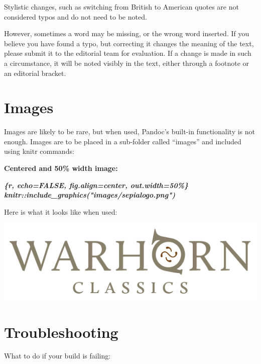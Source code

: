 \documentclass[
]{book}
\newenvironment{Shaded}{\begin{snugshade}}{\end{snugshade}}
\newcommand{\InformationTok}[1]{\textcolor[rgb]{0.56,0.35,0.01}{\textbf{\textit{#1}}}}
\begin{document}
Stylistic changes, such as switching from British to American quotes are not considered typos and do not need to be noted.

However, sometimes a word may be missing, or the wrong word inserted. If you believe you have found a typo, but correcting it changes the meaning of the text, please submit it to the editorial team for evaluation. If a change is made in such a circumstance, it will be noted visibly in the text, either through a footnote or an editorial bracket.

\hypertarget{images}{%
\chapter{Images}\label{images}}

Images are likely to be rare, but when used, Pandoc's built-in functionality is not enough. Images are to be placed in a sub-folder called ``images'' and included using knitr commands:

\textbf{Centered and 50\% width image:}

\begin{Shaded}
\begin{Highlighting}[]
\InformationTok{\textasciigrave{}\textasciigrave{}\textasciigrave{}\{r, echo=FALSE, fig.align=\textquotesingle{}center\textquotesingle{}, out.width=\textquotesingle{}50\%\textquotesingle{}\}}
\InformationTok{knitr::include\_graphics("images/sepialogo.png")}
\InformationTok{\textasciigrave{}\textasciigrave{}\textasciigrave{}}
\end{Highlighting}
\end{Shaded}

Here is what it looks like when used:

\begin{center}\includegraphics[width=0.5\linewidth]{images/sepialogo} \end{center}

\hypertarget{troubleshooting}{%
\chapter{Troubleshooting}\label{troubleshooting}}

What to do if your build is failing:
\end{document}
